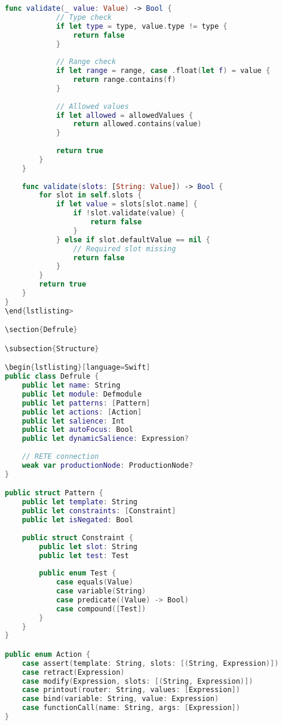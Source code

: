 \begin{lstlisting}[language=Swift]
        func validate(_ value: Value) -> Bool {
            // Type check
            if let type = type, value.type != type {
                return false
            }
            
            // Range check
            if let range = range, case .float(let f) = value {
                return range.contains(f)
            }
            
            // Allowed values
            if let allowed = allowedValues {
                return allowed.contains(value)
            }
            
            return true
        }
    }
    
    func validate(slots: [String: Value]) -> Bool {
        for slot in self.slots {
            if let value = slots[slot.name] {
                if !slot.validate(value) {
                    return false
                }
            } else if slot.defaultValue == nil {
                // Required slot missing
                return false
            }
        }
        return true
    }
}
\end{lstlisting>

\section{Defrule}

\subsection{Structure}

\begin{lstlisting}[language=Swift]
public class Defrule {
    public let name: String
    public let module: Defmodule
    public let patterns: [Pattern]
    public let actions: [Action]
    public let salience: Int
    public let autoFocus: Bool
    public let dynamicSalience: Expression?
    
    // RETE connection
    weak var productionNode: ProductionNode?
}

public struct Pattern {
    public let template: String
    public let constraints: [Constraint]
    public let isNegated: Bool
    
    public struct Constraint {
        public let slot: String
        public let test: Test
        
        public enum Test {
            case equals(Value)
            case variable(String)
            case predicate((Value) -> Bool)
            case compound([Test])
        }
    }
}

public enum Action {
    case assert(template: String, slots: [(String, Expression)])
    case retract(Expression)
    case modify(Expression, slots: [(String, Expression)])
    case printout(router: String, values: [Expression])
    case bind(variable: String, value: Expression)
    case functionCall(name: String, args: [Expression])
}
\end{lstlisting}

